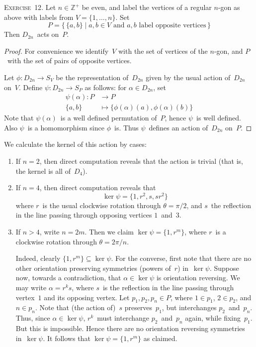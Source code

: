 \documentclass[letterpaper]{article}
\newcommand{\exercise}[1]{\goodbreak\noindent\textsc{Exercise~{#1}.}}
\newcommand{\Z}{\mathbb{Z}}
\begin{document}
\bigskip
\exercise{12}
Let $n\in\Z^+$ be even, and label the vertices of a regular $n$-gon as above with labels from $V=\{1,\ldots,n\}$. Set
$$P=\{\,\{a,b\}\mid a,b\in V\text{ and }a,b\text{ label opposite vertices}\,\}$$
Then $D_{2n}$~acts on~$P$.
\begin{proof}
For convenience we identify~$V$ with the set of vertices of the $n$-gon, and $P$~with the set of pairs of opposite vertices.

Let $\phi:D_{2n}\to S_V$ be the representation of~$D_{2n}$ given by the usual action of~$D_{2n}$ on~$V$. Define $\psi:D_{2n}\to S_P$ as follows: for $\alpha\in D_{2n}$, set
\begin{align*}
\psi(\alpha):P&\to P\\
\{a,b\}&\mapsto\{\phi(\alpha)(a),\phi(\alpha)(b)\}
\end{align*}
Note that $\psi(\alpha)$~is a well defined permutation of~$P$, hence $\psi$~is well defined. Also $\psi$~is a homomorphism since $\phi$~is. Thus $\psi$~defines an action of~$D_{2n}$ on~$P$.
\end{proof}
\noindent We calculate the kernel of this action by cases:
\begin{enumerate}
\item If $n=2$, then direct computation reveals that the action is trivial (that is, the kernel is all of~$D_4$).
\item If $n=4$, then direct computation reveals that
$$\ker\psi=\{1,r^2,s,sr^2\}$$
where $r$~is the usual clockwise rotation through $\theta=\pi/2$, and $s$~the reflection in the line passing through opposing vertices $1$~and~$3$.
\item If $n>4$, write $n=2m$. Then we claim $\ker\psi=\{1,r^m\}$, where $r$~is a clockwise rotation through $\theta=2\pi/n$.

Indeed, clearly $\{1,r^m\}\subseteq\ker\psi$. For the converse, first note that there are no other orientation preserving symmetries (powers of~$r$) in~$\ker\psi$. Suppose now, towards a contradiction, that $\alpha\in\ker\psi$ is orientation reversing. We may write $\alpha=r^ks$, where $s$~is the reflection in the line passing through vertex~$1$ and its opposing vertex. Let $p_1,p_2,p_n\in P$, where $1\in p_1$, $2\in p_2$, and $n\in p_n$. Note that (the action of)~$s$ preserves~$p_1$, but interchanges $p_2$~and~$p_n$. Thus, since $\alpha\in\ker\psi$, $r^k$~must interchange $p_2$~and~$p_n$ again, while fixing~$p_1$. But this is impossible. Hence there are no orientation reversing symmetries in~$\ker\psi$. It follows that $\ker\psi=\{1,r^m\}$ as claimed.
\end{enumerate}
\end{document}
